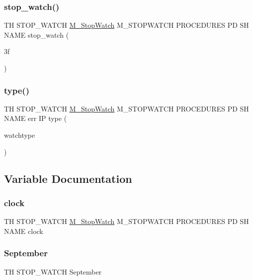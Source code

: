 \subsubsection{\texorpdfstring{stop\+\_\+watch()}{stop\_watch()}}
{\footnotesize\ttfamily TH S\+T\+O\+P\+\_\+\+W\+A\+T\+CH \hyperlink{option__stopwatch_83_8txt_aa2011fc45a5e502e87ee50996a8a9305}{M\+\_\+\+Stop\+Watch} M\+\_\+\+S\+T\+O\+P\+W\+A\+T\+CH P\+R\+O\+C\+E\+D\+U\+R\+ES PD SH N\+A\+ME stop\+\_\+watch (\begin{DoxyParamCaption}\item[{3f}]{ }\end{DoxyParamCaption})}

\mbox{\label{stop__watch_83_8txt_a70f0ead91c32e25323c03265aa302c1c}} 
\subsubsection{\texorpdfstring{type()}{type()}}
{\footnotesize\ttfamily TH S\+T\+O\+P\+\_\+\+W\+A\+T\+CH \hyperlink{option__stopwatch_83_8txt_aa2011fc45a5e502e87ee50996a8a9305}{M\+\_\+\+Stop\+Watch} M\+\_\+\+S\+T\+O\+P\+W\+A\+T\+CH P\+R\+O\+C\+E\+D\+U\+R\+ES PD SH N\+A\+ME err IP type (\begin{DoxyParamCaption}\item[{watchtype}]{ }\end{DoxyParamCaption})}



\subsection{Variable Documentation}
\mbox{\label{stop__watch_83_8txt_a148c035b430d6edf5413dbd2704facfb}} 
\subsubsection{\texorpdfstring{clock}{clock}}
{\footnotesize\ttfamily TH S\+T\+O\+P\+\_\+\+W\+A\+T\+CH \hyperlink{option__stopwatch_83_8txt_aa2011fc45a5e502e87ee50996a8a9305}{M\+\_\+\+Stop\+Watch} M\+\_\+\+S\+T\+O\+P\+W\+A\+T\+CH P\+R\+O\+C\+E\+D\+U\+R\+ES PD SH N\+A\+ME clock}

\mbox{\label{stop__watch_83_8txt_a1d05d9f5f870208fd0790859b520508a}} 
\subsubsection{\texorpdfstring{September}{September}}
{\footnotesize\ttfamily TH S\+T\+O\+P\+\_\+\+W\+A\+T\+CH September}

